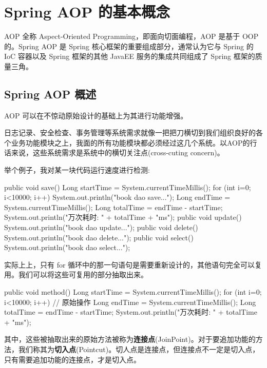 \section{Spring AOP 的基本概念}

AOP 全称 Aspect-Oriented Programming，即面向切面编程，AOP 是基于 OOP 的。Spring AOP 是 Spring 核心框架的重要组成部分，通常认为它与 Spring 的 IoC 容器以及 Spring 框架的其他 JavaEE 服务的集成共同组成了 Spring 框架的质量三角。

\subsection{Spring AOP 概述}

AOP 可以在不惊动原始设计的基础上为其进行功能增强。

日志记录、安全检查、事务管理等系统需求就像一把把刀横切到我们组织良好的各个业务功能模块之上，我面的所有功能模块都必须经过这几个系统。以AOP的行话来说，这些系统需求是系统中的横切关注点(cross-cuting concern)。

举个例子，我对某一块代码运行速度进行检测:

\begin{Java}
public void save() {
    Long startTime = System.currentTimeMillis();
    for (int i=0; i<10000; i++) {
        System.out.println("book dao save...");
    }
    Long endTime = System.currentTimeMillis();
    Long totalTime = endTime - startTime;
    System.out.println("万次耗时: " + totalTime + "ms");
}
public void update() {
    System.out.println("book dao update...");
}
public void delete() {
    System.out.println("book dao delete...");
}
public void select() {
    System.out.println("book dao select...");
}
\end{Java}

实际上上，只有 for 循环中的那一句语句是需要重新设计的，其他语句完全可以复用。我们可以将这些可复用的部分抽取出来。

\begin{Java}
public void method() {
    Long startTime = System.currentTimeMillis();
    for (int i=0; i<10000; i++) {
        // 原始操作
    }
    Long endTime = System.currentTimeMillis();
    Long totalTime = endTime - startTime;
    System.out.println("万次耗时: " + totalTime + "ms");
}
\end{Java}

其中，这些被抽取出来的原始方法被称为\textbf{连接点}(JoinPoint)。对于要追加功能的方法，我们称其为\textbf{切入点}(Pointcut)。切人点是连接点，但连接点不一定是切入点，只有需要追加功能的连接点，才是切入点。

